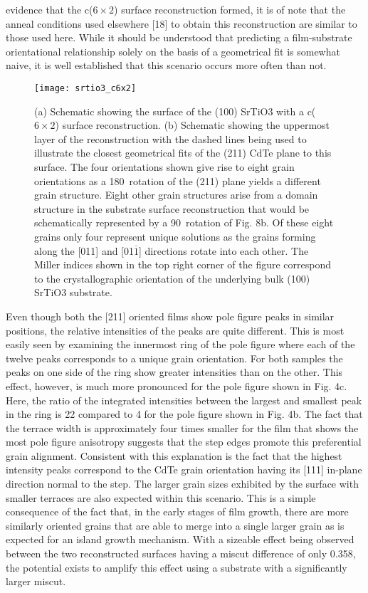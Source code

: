 evidence that the c($6\times2$) surface reconstruction formed, it is of
note that the anneal conditions used elsewhere [18] to obtain this
reconstruction are similar to those used here. While it should be
understood that predicting a film-substrate orientational relationship solely on the basis of a geometrical fit is somewhat naive, it is well established that this scenario occurs more often than not.
\begin{figure}
    \centering
    \texttt{[image: srtio3\_c6x2]}
    \caption{\label{fig:srtio3_c6x2}(a) Schematic showing the surface of the (100) SrTiO3 with a c($6\times2$) surface reconstruction. (b) Schematic showing the uppermost layer of the reconstruction with the
        dashed lines being used to illustrate the closest geometrical fits of the (211) CdTe plane to this surface. The four orientations shown give rise to eight grain orientations as a
        180\degree~rotation of the (211) plane yields a different grain structure. Eight other grain structures arise from a domain structure in the substrate surface reconstruction that
        would be schematically represented by a 90\degree~rotation of Fig. 8b. Of these eight grains only four represent unique solutions as the grains forming along the [011] and [01$\overline{1}$]
        directions rotate into each other. The Miller indices shown in the top right corner of the figure correspond to the crystallographic orientation of the underlying bulk (100)
        SrTiO3 substrate.}
\end{figure}

Even though both the [211] oriented films show pole figure
peaks in similar positions, the relative intensities of the peaks are
quite different. This is most easily seen by examining the
innermost ring of the pole figure where each of the twelve peaks
corresponds to a unique grain orientation. For both samples the
peaks on one side of the ring show greater intensities than on the
other. This effect, however, is much more pronounced for the pole
figure shown in Fig. 4c. Here, the ratio of the integrated intensities
between the largest and smallest peak in the ring is 22 compared to
4 for the pole figure shown in Fig. 4b. The fact that the terrace
width is approximately four times smaller for the film that shows
the most pole figure anisotropy suggests that the step edges
promote this preferential grain alignment. Consistent with this
explanation is the fact that the highest intensity peaks correspond
to the CdTe grain orientation having its [111] in-plane direction
normal to the step. The larger grain sizes exhibited by the surface
with smaller terraces are also expected within this scenario. This is
a simple consequence of the fact that, in the early stages of film
growth, there are more similarly oriented grains that are able to
merge into a single larger grain as is expected for an island growth
mechanism. With a sizeable effect being observed between the two
reconstructed surfaces having a miscut difference of only 0.358, the
potential exists to amplify this effect using a substrate with a
significantly larger miscut.

